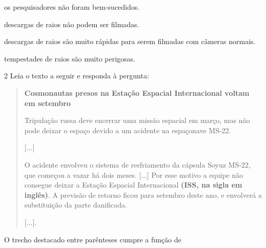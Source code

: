 \begin{escolha}
\item os pesquisadores não foram bem-sucedidos.

\item descargas de raios não podem ser filmadas.

\item descargas de raios são muito rápidas para serem filmadas com câmeras normais.

\item tempestades de raios são muito perigosas.
\end{escolha}


\num{2} Leia o texto a seguir e responda à pergunta:

\begin{quote}
\textbf{Cosmonautas presos na Estação Espacial Internacional voltam em
setembro}

Tripulação russa deve encerrar uma missão espacial em março, mas não
pode deixar o espaço devido a um acidente na espaçonave MS-22.

{[}...{]}

O acidente envolveu o sistema de resfriamento da cápsula Soyuz MS-22,
que começou a vazar há dois meses. {[}...{]} Por esse motivo a equipe
não consegue deixar a Estação Espacial Internacional \textbf{(ISS, na
sigla em inglês)}. A previsão de retorno ficou para setembro deste ano,
e envolverá a substituição da parte danificada.

{[}...{]}.

\end{quote}

O trecho destacado entre parênteses cumpre a função de


